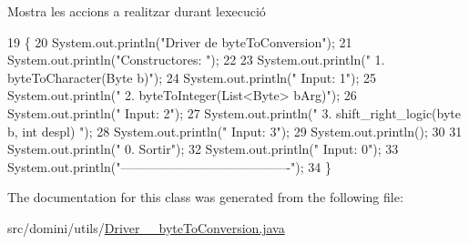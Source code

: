Mostra les accions a realitzar durant l\textquotesingle{}execució 


\begin{DoxyCode}
19                                      \{
20         System.out.println(\textcolor{stringliteral}{"Driver de byteToConversion"});
21         System.out.println(\textcolor{stringliteral}{"Constructores: "});
22 
23         System.out.println(\textcolor{stringliteral}{"     1. byteToCharacter(Byte b)"});
24         System.out.println(\textcolor{stringliteral}{"     Input: 1"});
25         System.out.println(\textcolor{stringliteral}{"     2. byteToInteger(List<Byte> bArg)"});
26         System.out.println(\textcolor{stringliteral}{"     Input: 2"});
27         System.out.println(\textcolor{stringliteral}{"     3. shift\_right\_logic(byte b, int despl) "});
28         System.out.println(\textcolor{stringliteral}{"     Input: 3"});
29         System.out.println();
30 
31         System.out.println(\textcolor{stringliteral}{"     0. Sortir"});
32         System.out.println(\textcolor{stringliteral}{"     Input: 0"});
33         System.out.println(\textcolor{stringliteral}{"----------------------------------------"});
34     \}
\end{DoxyCode}


The documentation for this class was generated from the following file\+:\begin{DoxyCompactItemize}
\item 
src/domini/utils/\hyperlink{Driver____byteToConversion_8java}{Driver\+\_\+\+\_\+byte\+To\+Conversion.\+java}\end{DoxyCompactItemize}
